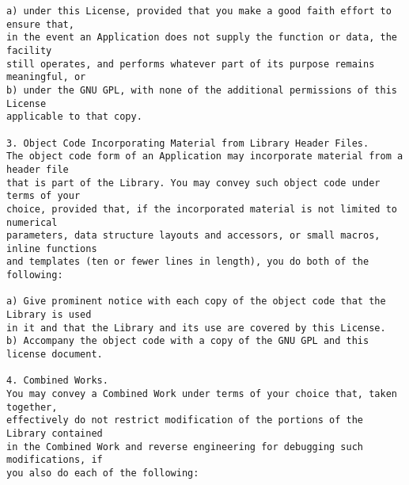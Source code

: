 \begin{verbatim}
a) under this License, provided that you make a good faith effort to ensure that,
in the event an Application does not supply the function or data, the facility
still operates, and performs whatever part of its purpose remains meaningful, or
b) under the GNU GPL, with none of the additional permissions of this License
applicable to that copy.

3. Object Code Incorporating Material from Library Header Files.
The object code form of an Application may incorporate material from a header file
that is part of the Library. You may convey such object code under terms of your
choice, provided that, if the incorporated material is not limited to numerical
parameters, data structure layouts and accessors, or small macros, inline functions
and templates (ten or fewer lines in length), you do both of the following:

a) Give prominent notice with each copy of the object code that the Library is used
in it and that the Library and its use are covered by this License.
b) Accompany the object code with a copy of the GNU GPL and this license document.

4. Combined Works.
You may convey a Combined Work under terms of your choice that, taken together,
effectively do not restrict modification of the portions of the Library contained
in the Combined Work and reverse engineering for debugging such modifications, if
you also do each of the following:


\end{verbatim}
